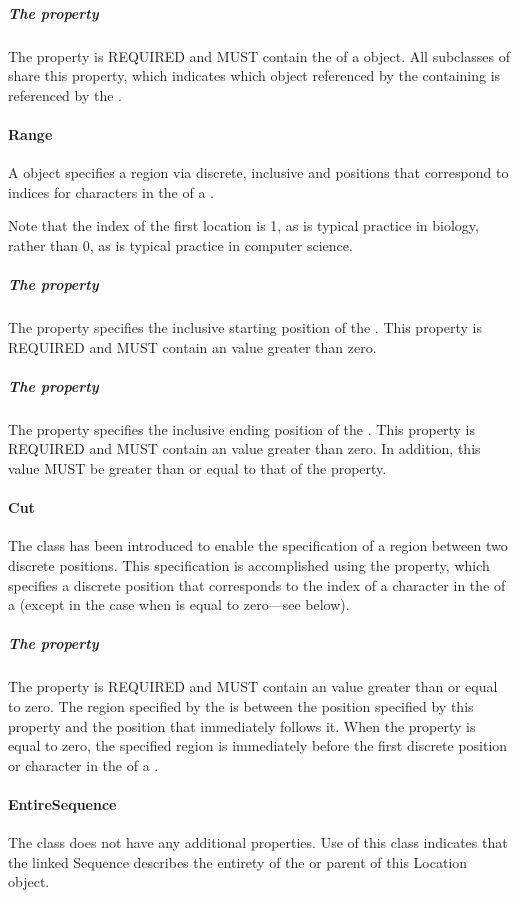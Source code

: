 \subparagraph{The  property}
\label{sec:hasSequence:L}
The  property is REQUIRED and MUST contain the  of a  object. All subclasses of  share this property, which indicates which  object referenced by the containing  is referenced by the .

\paragraph{Range}
\label{sec:Range}
A  object specifies a region via discrete, inclusive  and  positions that correspond to indices for characters in the   of a .

Note that the index of the first location is 1, as is typical practice in biology, rather than 0, as is typical practice in computer science.

\subparagraph{The  property}\label{sec:start}
The  property specifies the inclusive starting position of the . This property is REQUIRED and MUST contain an  value greater than zero.

\subparagraph{The  property}\label{sec:end}
The  property specifies the inclusive ending position of the . This property is REQUIRED and MUST contain an  value greater than zero. In addition, this  value MUST be greater than or equal to that of the  property.

\paragraph{Cut}
\label{sec:Cut}
The  class has been introduced to enable the specification of a region between two discrete positions.
This specification is accomplished using the  property, which specifies a discrete position that corresponds to the index of a character in the   of a  (except in the case when  is equal to zero---see below).

\subparagraph{The  property}
\label{sec:at}
The  property is REQUIRED and MUST contain an  value greater than or equal to zero. The region specified by the  is between the position specified by this property and the position that immediately follows it. When the  property is equal to zero, the specified region is immediately before the first discrete position or character in the   of a .


\paragraph{EntireSequence}
\label{sec:EntireSequence}
The  class does not have any additional properties. Use of this class indicates that the linked Sequence describes the entirety of the  or  parent of this Location object.

